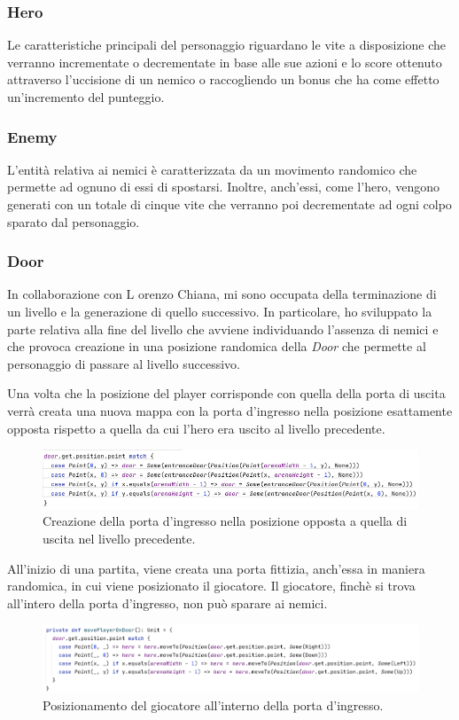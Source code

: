 \subsubsection{Hero}

Le caratteristiche principali del personaggio riguardano le vite a disposizione che verranno incrementate o decrementate in base alle sue azioni e lo score ottenuto attraverso l'uccisione di un nemico o raccogliendo un bonus che ha come effetto un'incremento del punteggio.

\subsubsection{Enemy}

L'entità relativa ai nemici è caratterizzata da un movimento randomico che permette ad ognuno di essi di spostarsi. Inoltre, anch'essi, come l'hero, vengono generati con un totale di cinque vite che verranno poi decrementate ad ogni colpo sparato dal personaggio.

\subsubsection{Door}
In collaborazione con L
orenzo Chiana, mi sono occupata della terminazione di un livello e la generazione di quello successivo. In particolare, ho sviluppato la parte relativa alla fine del livello che avviene individuando l'assenza di nemici e che provoca creazione in una posizione randomica della \textit{Door} che permette al personaggio di passare al livello successivo. 

Una volta che la posizione del player corrisponde con quella della porta di uscita verrà creata una nuova mappa con la porta d'ingresso nella posizione esattamente opposta rispetto a quella da cui l'hero era uscito al livello precedente.

\begin{figure}[H]\centering
  \includegraphics[width=15cm]{res/createOppositeDoor.png}
  \caption{Creazione della porta d'ingresso nella posizione opposta a quella di uscita nel livello precedente.}
  \label{gameState}
\end{figure}

All'inizio di una partita, viene creata una porta fittizia, anch'essa in maniera randomica, in cui viene posizionato il giocatore.
Il giocatore, finchè si trova all'intero della porta d'ingresso, non può sparare ai nemici.

\begin{figure}[H]\centering
  \includegraphics[width=15cm]{res/movePlayerOnDoor.png}
  \caption{Posizionamento del giocatore all'interno della porta d'ingresso.}
  \label{gameState}
\end{figure}


